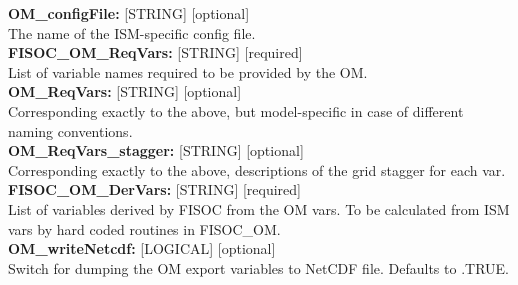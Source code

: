 \documentclass[12pt]{article}
\begin{document}
\begin{flushleft}
\textbf{OM\_configFile:}      [STRING] [optional]                          \\
The name of the ISM-specific config file.                                  \\
\vspace{6pt}
\textbf{FISOC\_OM\_ReqVars:}  [STRING] [required]                          \\
List of variable names required to be provided by the OM.                  \\
\vspace{6pt}
\textbf{OM\_ReqVars:}         [STRING] [optional]                          \\
Corresponding exactly to the above, but model-specific in case of different naming conventions. \\
\vspace{6pt}
\textbf{OM\_ReqVars\_stagger:} [STRING] [optional]                         \\
Corresponding exactly to the above, descriptions of the grid stagger for each var. \\
\vspace{6pt}
\textbf{FISOC\_OM\_DerVars:}  [STRING] [required]                          \\
List of variables derived by FISOC from the OM vars.  
To be calculated from ISM vars by hard coded routines in FISOC\_OM.        \\
\vspace{6pt}
\textbf{OM\_writeNetcdf:}   [LOGICAL] [optional]                          \\
Switch for dumping the OM export variables to NetCDF file.
Defaults to .TRUE.                                                         \\
\vspace{6pt}



\end{flushleft}
\end{document}
